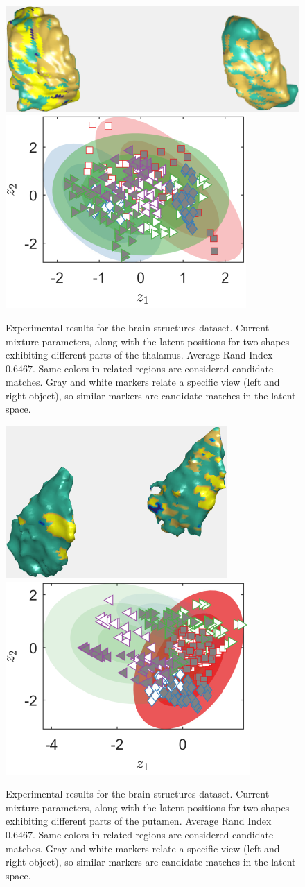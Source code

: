 \documentclass[]{article}
\begin{document}
\begin{figure}[ht!]
	\centering
	
	\includegraphics[width=0.45\linewidth]{img/thalamus1MVMMexp1}
	\includegraphics[width=0.35\linewidth]{img/thalamus1MVMMexp3v}
	\caption{Experimental results for the brain structures dataset.  Current mixture parameters, along with the latent positions for two shapes exhibiting different parts of the thalamus. Average Rand Index $0.6467$. Same colors in related regions are considered candidate matches. Gray and white markers relate a specific view (left and right object), so similar markers are candidate matches in the latent space. }
	\label{fig:brainT}
\end{figure}


\begin{figure}[ht!]
	\centering
	
	\includegraphics[width=0.45\linewidth]{img/putamen1MVMMexp1v}
	\includegraphics[width=0.35\linewidth]{img/putamen1MVMMexp3v}
	\caption{Experimental results for the brain structures dataset.  Current mixture parameters, along with the latent positions for two shapes exhibiting different parts of the putamen. Average Rand Index $0.6467$. Same colors in related regions are considered candidate matches. Gray and white markers relate a specific view (left and right object), so similar markers are candidate matches in the latent space. }
	\label{fig:brainP}
\end{figure}
\end{document}
